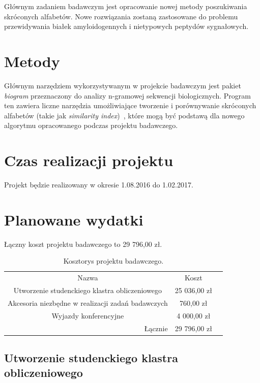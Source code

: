 \documentclass{article}
\begin{document}
Głównym zadaniem badawczym jest opracowanie nowej metody poszukiwania 
skróconych alfabetów. Nowe rozwiązania zostaną zastosowane do 
problemu przewidywania białek amyloidogennych i nietypowych peptydów 
sygnałowych.

\section{Metody}

Głównym narzędziem wykorzystywanym w projekcie badawczym jest pakiet 
\textit{biogram} przeznaczony do analizy n-gramowej sekwencji biologicznych. 
Program ten zawiera liczne narzędzia umożliwiające tworzenie i porównywanie 
skróconych alfabetów (takie jak \textit{similarity 
index})~\citep{stephenson_unearthing_2013}, które mogą być podstawą dla nowego 
algorytmu opracowanego podczas projektu badawczego.

\section{Czas realizacji projektu}

Projekt będzie realizowany w okresie 1.08.2016 do 1.02.2017.

\section{Planowane wydatki}

Łączny koszt projektu badawczego to 29 796,00 zł.

\begin{table}[!htbp]
\centering
\caption{Kosztorys projektu badawczego.}
\begin{tabular}{rrr}
\cline{1-2}
\multicolumn{1}{|c}{Nazwa}                                   & \multicolumn{1}{|c|}{Koszt}   &  \\ \cline{1-2}
\multicolumn{1}{|c}{Utworzenie studenckiego klastra obliczeniowego} & 
\multicolumn{1}{|c|}{25 036,00 zł} &  \\ \cline{1-2}
\multicolumn{1}{|c}{Akcesoria niezbędne w realizacji zadań badawczych}   & 
\multicolumn{1}{|c|}{760,00 zł} &  \\ \cline{1-2}
\multicolumn{1}{|c}{Wyjazdy konferencyjne}   & 
\multicolumn{1}{|c|}{4 000,00 zł} &  \\ \cline{1-2}
Łącznie    & 29 796,00 zł                    & 
\end{tabular}
\end{table}

\subsection{Utworzenie studenckiego klastra obliczeniowego}
\end{document}
